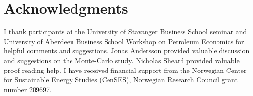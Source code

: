 \documentclass[12pt]{article}
\begin{document}
\section{Acknowledgments}
I thank participants at the University of Stavanger Business School seminar and University of Aberdeen Business School Workshop on Petroleum Economics for helpful comments and suggestions. Jonas Andersson provided valuable discussion and suggestions on the Monte-Carlo study. Nicholas Sheard provided valuable proof reading help. I have received financial support from the Norwegian Center for Sustainable Energy Studies (CenSES), Norwegian Research Council grant number 209697. 

\begin{spacing}{1}


\end{spacing}
\end{document}

